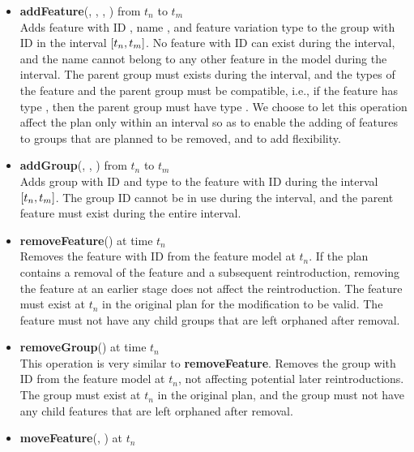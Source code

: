 \begin{itemize}
  \item \textbf{addFeature}(, , , ) from $t_n$ to $t_m$\\
      Adds feature with ID , name , and feature variation type  to the group with ID  in the interval $\interval{t_n}{t_m}$. No feature with ID  can exist during the interval, and the name cannot belong to any other feature in the model during the interval. The parent group must exists during the interval, and the types of the feature and the parent group must be compatible, i.e., if the feature has type \mandatory{}, then the parent group must have type \andtype{}. We choose to let this operation affect the plan only within an interval so as to enable the adding of features to groups that are planned to be removed, and to add flexibility.
  \item \textbf{addGroup}(, , ) from $t_n$ to $t_m$\\
      Adds group with ID  and type  to the feature with ID  during the interval $\interval{t_n}{t_m}$. The group ID cannot be in use during the interval, and the parent feature must exist during the entire interval. 
  \item \textbf{removeFeature}() at time $t_n$\\
      Removes the feature with ID  from the feature model at $t_n$. If the plan contains a removal of the feature and a subsequent reintroduction, removing the feature at an earlier stage does not affect the reintroduction. The feature must exist at $t_n$ in the original plan for the modification to be valid. The feature must not have any child groups that are left orphaned after removal. 
  \item \textbf{removeGroup}() at time $t_n$\\
      This operation is very similar to \textbf{removeFeature}. Removes the group with ID  from the feature model at $t_n$, not affecting potential later reintroductions. The group must exist at $t_n$ in the original plan, and the group must not have any child features that are left orphaned after removal. 
  \item \textbf{moveFeature}(, ) at $t_n$\\

\end{itemize}
